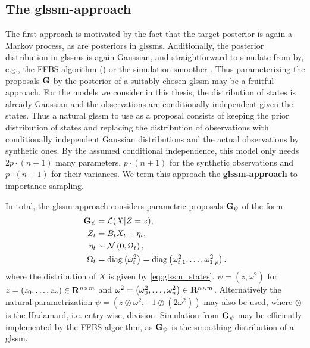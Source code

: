 \subsection{\texorpdfstring{The \gls{glssm}-approach}{The GLSSM-approach}}
\label{subsec:glssm-approach}
The first approach is motivated by the fact that the target posterior is again a Markov process, as are posteriors in \glspl{glssm}. Additionally, the posterior distribution in \gls{glssm}s is again Gaussian, and straightforward to simulate from by, e.g., the FFBS algorithm () or the simulation smoother \cite{Durbin2002Simple}. Thus parameterizing the proposals $\mathbf G$ by the posterior of a suitably chosen \gls{glssm} may be a fruitful approach.
For the models we consider in this thesis, the distribution of states is already Gaussian and the observations are conditionally independent given the states. Thus a natural \gls{glssm} to use as a proposal consists of keeping the prior distribution of states and replacing the distribution of observations with conditionally independent Gaussian distributions and the actual observations by synthetic ones. By the assumed conditional independence, this model only needs $2 p\cdot (n + 1)$ many parameters, $p\cdot (n + 1)$ for the synthetic observations and $p\cdot (n + 1)$ for their variances. We term this approach the \textbf{\gls{glssm}-approach} to importance sampling.

In total, the \gls{glssm}-approach considers parametric proposals $\mathbf G_{\psi}$ of the form
\begin{align}
    \begin{split}
    \label{eq:glssm-proposal}
    \mathbf G_{\psi} &= \mathcal L(X | Z = z),\\
    Z_{t} &= B_{t} X_{t} + \eta_{t},\\
    \eta_{t} &\sim \mathcal N \left( 0, \Omega_{t} \right),\\
    \Omega_{t} &= \operatorname{diag} \left( \omega^{2}_{t} \right) = \operatorname{diag} \left( \omega^{2}_{t,1}, \dots, \omega^{2}_{1,p} \right).
    \end{split}
\end{align}
where the distribution of $X$ is given by \eqref{eq:glssm_states}, $\psi = \left( z, \omega^{2} \right)$ for $z = \left( z_{0}, \dots, z_{n} \right) \in \mathbf R^{n \times m}$ and $\omega^{2} = \left( \omega^{2}_{0}, \dots, \omega^{2}_{n} \right) \in \mathbf R^{n \times m}$. Alternatively the natural parametrization $\psi = \left( z \oslash \omega^{2}, - 1 \oslash \left( 2 \omega^{2} \right) \right)$ may also be used, where $\oslash$ is the Hadamard, i.e. entry-wise, division. Simulation from $\mathbf G_{\psi}$ may be efficiently implemented by the FFBS algorithm, as $\mathbf G_{\psi}$ is the smoothing distribution of a \gls{glssm}. 

